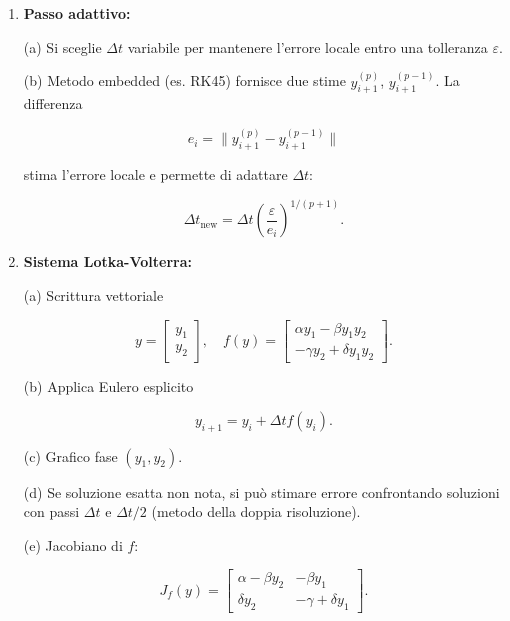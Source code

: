 \documentclass[12pt,a4paper]{article}
\begin{document}
\begin{enumerate}
\[
k_1 = A y_0, \quad k_2 = A (y_0 + \Delta t k_1).
\]

(c) Verifica ordine tramite sviluppo di Taylor è standard e conferma ordine 2.



\item \textbf{Passo adattivo:}

(a) Si sceglie \(\Delta t\) variabile per mantenere l’errore locale entro una tolleranza \(\varepsilon\).

(b) Metodo embedded (es. RK45) fornisce due stime \( y_{i+1}^{(p)} \), \( y_{i+1}^{(p-1)} \). La differenza

\[
e_i = \| y_{i+1}^{(p)} - y_{i+1}^{(p-1)} \|
\]

stima l’errore locale e permette di adattare \(\Delta t\):

\[
\Delta t_{\text{new}} = \Delta t \left( \frac{\varepsilon}{e_i} \right)^{1/(p+1)}.
\]


\item \textbf{Sistema Lotka-Volterra:}

(a) Scrittura vettoriale

\[
y = \begin{bmatrix} y_1 \\ y_2 \end{bmatrix}, \quad
f(y) = \begin{bmatrix} \alpha y_1 - \beta y_1 y_2 \\ -\gamma y_2 + \delta y_1 y_2 \end{bmatrix}.
\]

(b) Applica Eulero esplicito

\[
y_{i+1} = y_i + \Delta t f(y_i).
\]

(c) Grafico fase \( (y_1, y_2) \).

(d) Se soluzione esatta non nota, si può stimare errore confrontando soluzioni con passi \( \Delta t \) e \( \Delta t/2 \) (metodo della doppia risoluzione).

(e) Jacobiano di \( f \):

\[
J_f(y) = 
\begin{bmatrix}
\alpha - \beta y_2 & -\beta y_1 \\
\delta y_2 & -\gamma + \delta y_1
\end{bmatrix}.
\]

\end{enumerate}
\end{document}
